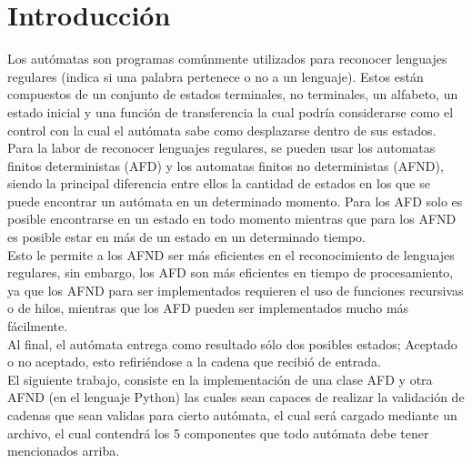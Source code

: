 \section{Introducción}
	Los autómatas son programas comúnmente utilizados para reconocer lenguajes regulares (indica si una palabra pertenece o no a un lenguaje). Estos están compuestos de un conjunto de estados terminales, no terminales, un alfabeto, un estado inicial y una función de transferencia la cual podría considerarse como el control con la cual el autómata sabe como desplazarse dentro de sus estados.\\Para la labor de reconocer lenguajes regulares, se pueden usar los automatas finitos deterministas (AFD) y los automatas finitos no deterministas (AFND), siendo la principal diferencia entre ellos la cantidad de estados en los que se puede encontrar un autómata en un determinado momento. Para los AFD solo es posible encontrarse en un estado en todo momento mientras que para los AFND es posible estar en más de un estado en un determinado tiempo.\\Esto le permite a los AFND ser más eficientes en el reconocimiento de lenguajes regulares, sin embargo, los AFD son más eficientes en tiempo de procesamiento, ya que los AFND para ser implementados requieren el uso de funciones recursivas o de hilos, mientras que los AFD pueden ser implementados mucho más fácilmente.\\
	Al final, el autómata entrega como resultado sólo dos posibles estados; Aceptado o no aceptado, esto refiriéndose a la cadena que recibió de entrada.\\
	El siguiente trabajo, consiste en la implementación de una clase AFD y otra AFND (en el lenguaje Python) las cuales sean capaces de realizar la validación de cadenas que sean validas para cierto autómata, el cual será cargado mediante un archivo, el cual contendrá los 5 componentes que todo autómata debe tener mencionados arriba.
	